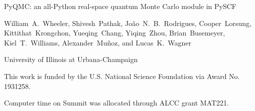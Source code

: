 \begin{frame}
\center

{\LARGE PyQMC: an all-Python real-space quantum Monte Carlo %
module in PySCF
}

\vspace{1em}
{
  William~A.~Wheeler, 
  Shivesh~Pathak, 
  Jo\~ao~N.~B.~Rodrigues,
  Cooper~Lorsung,
  Kittithat~Krongchon,
  Yueqing~Chang,
  Yiqing~Zhou,
  Brian~Busemeyer,
  Kiel~T.~Williams,
  Alexander~Mu\~noz,
  and Lucas~K.~Wagner
}

\vspace{1em}
{University of Illinois at Urbana-Champaign}

\vspace{1em}
{\scriptsize This work is funded by the U.S. National Science Foundation via Award No. 1931258.}

{\scriptsize Computer time on Summit was allocated through ALCC grant MAT221.}



\end{frame}
